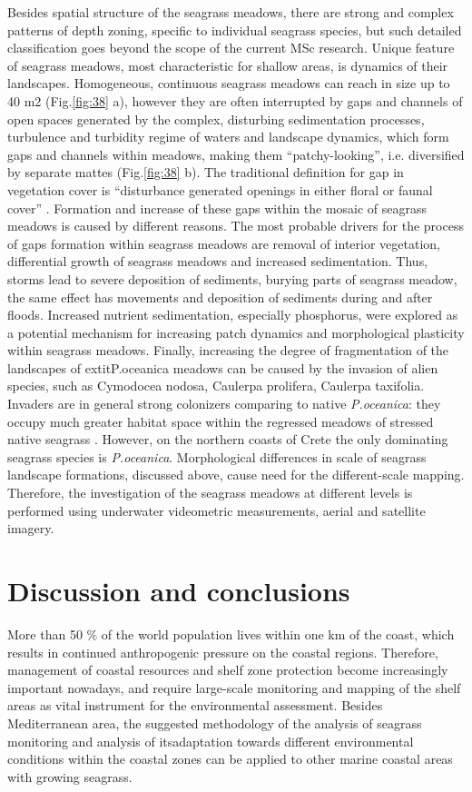 \documentclass[11pt]{article}
\begin{document}
Besides spatial structure of the seagrass meadows, there are strong and complex patterns of depth zoning, specific to individual
seagrass species, but such detailed classification goes beyond the scope of the current MSc research.
Unique feature of seagrass meadows, most characteristic for shallow areas, is dynamics of their
landscapes. Homogeneous, continuous seagrass meadows can reach in size up to 40 m2 (Fig.\ref{fig:38} a),
however they are often interrupted by gaps and channels of open spaces generated by the complex,
disturbing sedimentation processes, turbulence and turbidity regime of waters and landscape dynamics,
which form gaps and channels within meadows, making them “patchy-looking”, i.e. diversified by
separate mattes (Fig.\ref{fig:38} b). The traditional definition for gap in vegetation cover is “disturbance generated
openings in either floral or faunal cover” \cite{Connell78}\label{Connell78}.
Formation and increase of these
gaps within the mosaic of seagrass meadows is caused by different reasons. The most probable
drivers for the process of gaps formation within seagrass meadows are removal of interior vegetation,
differential growth of seagrass meadows and increased sedimentation. Thus, storms lead to severe
deposition of sediments, burying parts of seagrass meadow, the same effect has movements and
deposition of sediments during and after floods\cite{Bell99}\label{Bell99}.
Increased nutrient sedimentation, especially phosphorus, were explored \cite{Jensen01}\label{Jensen01} as a
potential mechanism for increasing patch dynamics and morphological plasticity within seagrass
meadows. Finally, increasing the degree of fragmentation of the landscapes of 	extit{P.oceanica} meadows
can be caused by the invasion of alien species, such as Cymodocea nodosa, Caulerpa prolifera,
Caulerpa taxifolia. Invaders are in general strong colonizers comparing to native \textit{P.oceanica}: they
occupy much greater habitat space within the regressed meadows of stressed native seagrass
\cite{Montefalcone10}\label{Montefalcone10}. However, on the northern coasts of Crete the only dominating seagrass
species is \textit{P.oceanica}.
Morphological differences in scale of seagrass landscape formations, discussed above, cause need for
the different-scale mapping. Therefore, the investigation of the seagrass meadows at different levels is
performed using underwater videometric measurements, aerial and satellite imagery.

\section{Discussion and conclusions}\label{sec:5}
More than 50 \% of the world population lives within one km of the coast, which results in continued anthropogenic pressure on the coastal regions. Therefore, management of coastal resources and shelf zone protection become increasingly important nowadays, and require large-scale monitoring and mapping of the shelf areas as vital instrument for the environmental assessment. Besides Mediterranean area, the suggested methodology of the analysis of seagrass monitoring and analysis of itsadaptation towards different environmental conditions within the coastal zones can be applied to other marine coastal areas with growing seagrass.
\end{document}
